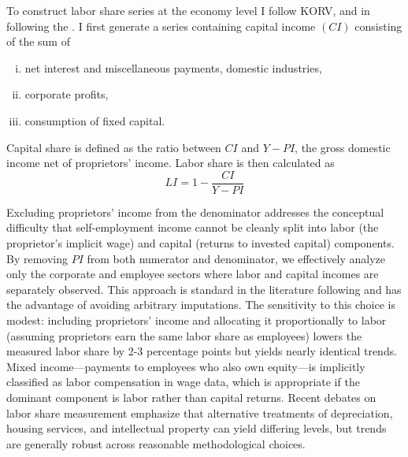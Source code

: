 \documentclass[12pt]{article}
\begin{document}
To construct labor share series at the economy level I follow KORV, \citet{castex2022decline} and \citet{ohanian2021revisiting} in following the \citet*{cooley1995frontiers}. I first generate a series containing capital income $(CI)$ consisting of the sum of 
\begin{enumerate}[(i)]
 \item net interest and miscellaneous payments, domestic industries,
 \item corporate profits,
 \item consumption of fixed capital.
\end{enumerate}
Capital share is defined as the ratio between $CI$ and $Y - PI$, the gross domestic income net of proprietors' income. Labor share is then calculated as 
\begin{equation*}
 LI = 1 - \frac{CI}{Y - PI}
\end{equation*}

Excluding proprietors' income from the denominator addresses the conceptual difficulty that self-employment income cannot be cleanly split into labor (the proprietor's implicit wage) and capital (returns to invested capital) components. By removing $PI$ from both numerator and denominator, we effectively analyze only the corporate and employee sectors where labor and capital incomes are separately observed. This approach is standard in the literature following \citet{cooley1995frontiers} and has the advantage of avoiding arbitrary imputations. The sensitivity to this choice is modest: including proprietors' income and allocating it proportionally to labor (assuming proprietors earn the same labor share as employees) lowers the measured labor share by 2-3 percentage points but yields nearly identical trends. Mixed income---payments to employees who also own equity---is implicitly classified as labor compensation in wage data, which is appropriate if the dominant component is labor rather than capital returns. Recent debates on labor share measurement \citep{elsby2013decline, karabarbounis2014global} emphasize that alternative treatments of depreciation, housing services, and intellectual property can yield differing levels, but trends are generally robust across reasonable methodological choices.
\end{document}
